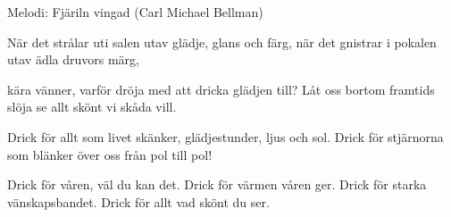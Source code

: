 \begin{song}

\begin{songmeta}
Melodi: Fjäriln vingad (Carl Michael Bellman)
\end{songmeta}

\begin{songtext}
När det strålar uti salen
utav glädje, glans och färg,
när det gnistrar i pokalen
utav ädla druvors märg,

kära vänner, varför dröja
med att dricka glädjen till?
Låt oss bortom framtids slöja
se allt skönt vi skåda vill.

Drick för allt som livet skänker,
glädjestunder, ljus och sol.
Drick för stjärnorna som blänker
över oss från pol till pol!

Drick för våren, väl du kan det.
Drick för värmen våren ger.
Drick för starka vänskapsbandet.
Drick för allt vad skönt du ser.
\end{songtext}

\end{song}
